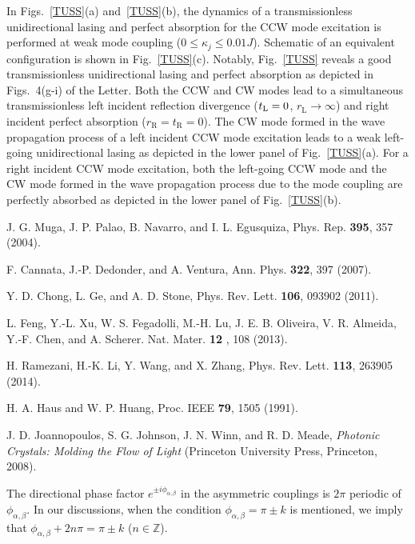 \documentclass[prl,showpacs,superscriptaddress,twocolumn]{revtex4-1}
\begin{document}
\begin{widetext}
In Figs.~\ref{TUSS}(a) and~\ref{TUSS}(b), the dynamics of a
transmissionless unidirectional lasing and perfect absorption for the CCW
mode excitation is performed at weak mode coupling ($0\leqslant \kappa
_{j}\leqslant 0.01J$). Schematic of an equivalent configuration is shown in
Fig.~\ref{TUSS}(c). Notably, Fig.~\ref{TUSS}
reveals a good transmissionless unidirectional lasing and perfect absorption
as depicted in Figs.~4(g-i) of the Letter. Both the CCW and CW modes lead to
a simultaneous transmissionless left incident reflection divergence ($t_{%
\mathrm{L}}=0$, $r_{\mathrm{L}}\rightarrow \infty $) and right incident
perfect absorption ($r_{\mathrm{R}}=t_{\mathrm{R}}=0$). The CW mode formed
in the wave propagation process of a left incident CCW mode excitation leads
to a weak left-going unidirectional lasing as depicted in the lower panel of
Fig.~\ref{TUSS}(a). For a right incident CCW mode
excitation, both the left-going CCW mode and the CW mode formed in the wave
propagation process due to the mode coupling are perfectly absorbed as
depicted in the lower panel of Fig.~\ref{TUSS}(b).

\begin{thebibliography}{99}
 J. G. Muga, J. P. Palao, B. Navarro, and I. L. Egusquiza,
Phys. Rep. \textbf{395}, 357 (2004).

 F. Cannata, J.-P. Dedonder, and A. Ventura, Ann.
Phys. \textbf{322}, 397 (2007).

 Y. D. Chong, L. Ge, and A. D. Stone, Phys. Rev. Lett.
\textbf{106}, 093902 (2011).

 L. Feng, Y.-L. Xu, W. S. Fegadolli, M.-H. Lu, J. E. B.
Oliveira, V. R. Almeida, Y.-F. Chen, and A. Scherer. Nat. Mater. \textbf{12}%
, 108 (2013).

 H. Ramezani, H.-K. Li, Y. Wang, and X. Zhang, Phys. Rev. Lett.
\textbf{113}, 263905 (2014).

 H. A. Haus and W. P. Huang, Proc. IEEE \textbf{79}, 1505
(1991).

 J. D. Joannopoulos, S. G. Johnson, J. N. Winn, and R.
D. Meade, \textit{Photonic Crystals: Molding the Flow of Light} (Princeton
University Press, Princeton, 2008).

 The directional phase factor $e^{\pm i\phi _{\alpha ,\beta }}$
in the asymmetric couplings is $2\pi $ periodic of $\phi _{\alpha ,\beta }$.
In our discussions, when the condition $\phi _{\alpha ,\beta }=\pi \pm k$ is
mentioned, we imply that $\phi _{\alpha ,\beta }+2n\pi =\pi \pm k$ ($n\in
\mathbb{Z}
$).


\end{thebibliography}
\end{widetext}
\end{document}
